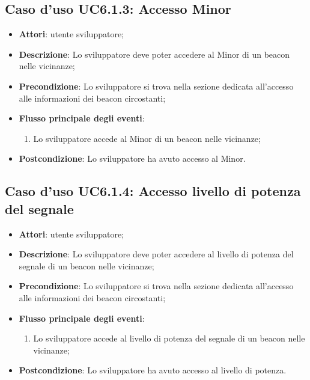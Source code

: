 \documentclass[../AnalisiDeiRequisiti.tex]{subfiles}
\begin{document}
\subsection{Caso d'uso UC6.1.3: Accesso Minor}


\begin{itemize}
\item \textbf{Attori}: utente sviluppatore;
\item \textbf{Descrizione}: Lo sviluppatore deve poter accedere al Minor di un beacon nelle vicinanze; 
      \item \textbf{Precondizione}: Lo sviluppatore si trova nella sezione dedicata all'accesso alle informazioni dei beacon circostanti;

        \item \textbf{Flusso principale degli eventi}:
          \begin{enumerate}
          \item Lo sviluppatore accede al Minor di un beacon nelle vicinanze;

      \end{enumerate}
    \item \textbf{Postcondizione}: Lo sviluppatore ha avuto accesso al Minor.
  \end{itemize}
\hypertarget{UC6.1.4}{}
\subsection{Caso d'uso UC6.1.4: Accesso livello di potenza del segnale}
\begin{itemize}
\item \textbf{Attori}: utente sviluppatore;
\item \textbf{Descrizione}: Lo sviluppatore deve poter accedere al livello di potenza del segnale di un beacon nelle vicinanze; 
      \item \textbf{Precondizione}: Lo sviluppatore si trova nella sezione dedicata all'accesso alle informazioni dei beacon circostanti;

        \item \textbf{Flusso principale degli eventi}:
          \begin{enumerate}
          \item Lo sviluppatore accede al livello di potenza del segnale di un beacon nelle vicinanze;

      \end{enumerate}
    \item \textbf{Postcondizione}: Lo sviluppatore ha avuto accesso al livello di potenza.
  \end{itemize}
\hypertarget{UC6.1.5}{}
\end{document}
